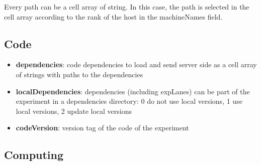 \documentclass[a4paper,fleqn]{tufte-handout}
\begin{document}
Every path can be a cell array of string. In this case, the path is selected in the cell array according to the rank of the host in the machineNames field.

\subsection{Code}

\begin{itemize}
\item \textbf{dependencies}: code dependencies to load and send server side as a cell array of strings with paths to the dependencies
\item \textbf{localDependencies}: dependencies (including expLanes) can be part of the experiment in a dependencies directory: 0 do not use local versions, 1 use local versions, 2 update local versions
\item \textbf{codeVersion}: version tag of the code of the experiment
\end{itemize}

\subsection{Computing}
\end{document}
